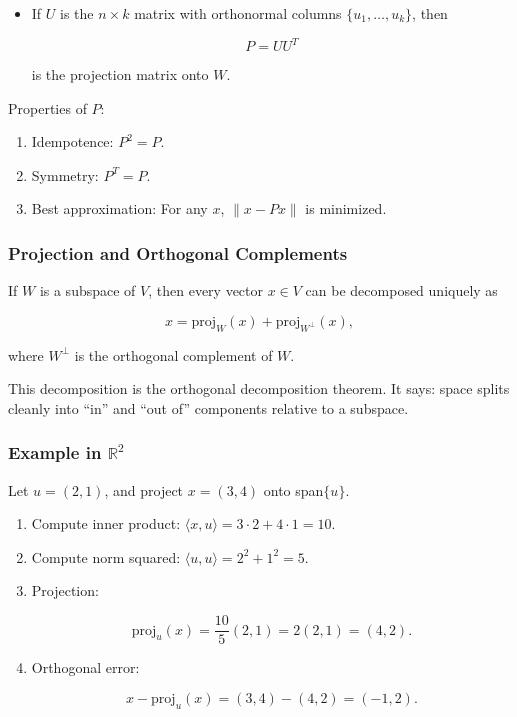 \documentclass[
  letterpaper,
  DIV=11,
  numbers=noendperiod]{scrreprt}
\providecommand{\tightlist}{%
  \setlength{\itemsep}{0pt}\setlength{\parskip}{0pt}}
\begin{document}
\begin{itemize}
\item
  If \(U\) is the \(n \times k\) matrix with orthonormal columns
  \(\{u_1, \dots, u_k\}\), then

  \[
  P = UU^T
  \]

  is the projection matrix onto \(W\).
\end{itemize}

Properties of \(P\):

\begin{enumerate}
\def\labelenumi{\arabic{enumi}.}
\tightlist
\item
  Idempotence: \(P^2 = P\).
\item
  Symmetry: \(P^T = P\).
\item
  Best approximation: For any \(x\), \(\|x - Px\|\) is minimized.
\end{enumerate}

\subsubsection{Projection and Orthogonal
Complements}\label{projection-and-orthogonal-complements}

If \(W\) is a subspace of \(V\), then every vector \(x \in V\) can be
decomposed uniquely as

\[
x = \text{proj}_W(x) + \text{proj}_{W^\perp}(x),
\]

where \(W^\perp\) is the orthogonal complement of \(W\).

This decomposition is the orthogonal decomposition theorem. It says:
space splits cleanly into ``in'' and ``out of'' components relative to a
subspace.

\subsubsection{\texorpdfstring{Example in
\(\mathbb{R}^2\)}{Example in \textbackslash mathbb\{R\}\^{}2}}\label{example-in-mathbbr2-4}

Let \(u = (2,1)\), and project \(x = (3,4)\) onto span\(\{u\}\).

\begin{enumerate}
\def\labelenumi{\arabic{enumi}.}
\item
  Compute inner product:
  \(\langle x,u\rangle = 3\cdot 2 + 4\cdot 1 = 10\).
\item
  Compute norm squared: \(\langle u,u\rangle = 2^2 + 1^2 = 5\).
\item
  Projection:

  \[
  \text{proj}_u(x) = \frac{10}{5}(2,1) = 2(2,1) = (4,2).
  \]
\item
  Orthogonal error:

  \[
  x - \text{proj}_u(x) = (3,4) - (4,2) = (-1,2).
  \]
\end{enumerate}
\end{document}
